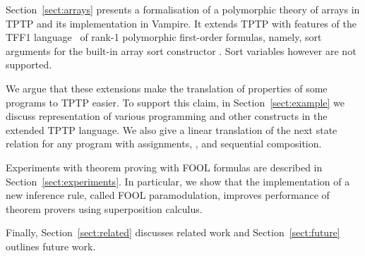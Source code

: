 Section~\ref{sect:arrays} presents a formalisation of a polymorphic theory of arrays in TPTP and its implementation in Vampire. It extends TPTP with features of the TFF1 language~\cite{tff1} of rank-1 polymorphic  first-order formulas, namely, sort arguments for the built-in array sort constructor \darraySymb. Sort variables however are not supported.

We argue that these extensions make the translation of properties of some programs to TPTP easier. To support this claim, in Section~\ref{sect:example} we discuss representation of various programming and other constructs in the extended TPTP language. We also give a linear translation of  the next state relation for any program with assignments, \ITE, and sequential composition.

Experiments with theorem proving with FOOL formulas are described in Section~\ref{sect:experiments}. In particular, we show that the implementation of a new inference rule, called FOOL paramodulation, improves performance of theorem provers using superposition calculus.

Finally, Section~\ref{sect:related} discusses related work and Section~\ref{sect:future} outlines future work.


